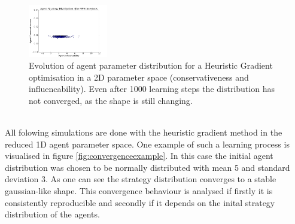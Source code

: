 \documentclass[11pt]{article}
\begin{document}
\begin{figure}
  \includegraphics[width=0.31\textwidth]{figures/2dsim_6.png}
  \caption[2D simulation]{Evolution of agent parameter distribution for a Heuristic Gradient optimisation in a 2D parameter space (conservativeness and influencability). Even after 1000 learning steps the distribution has not converged, as the shape is still changing.}
  \label{fig:2dsimulation}
\end{figure}

\hfill \\
All folowing simulations are done with the heuristic gradient method in the reduced 1D agent parameter space. One example of such a learning process is visualised in figure \ref{fig:convergenceexample}. In this case the initial agent distribution was chosen to be normally distributed with mean 5 and standard deviation 3. As one can see the strategy distribution converges to a stable gaussian-like shape. This convergence behaviour is analysed if firstly it is consistently reproducible and secondly if it depends on  the inital strategy distribution of the agents. \\
\end{document}
